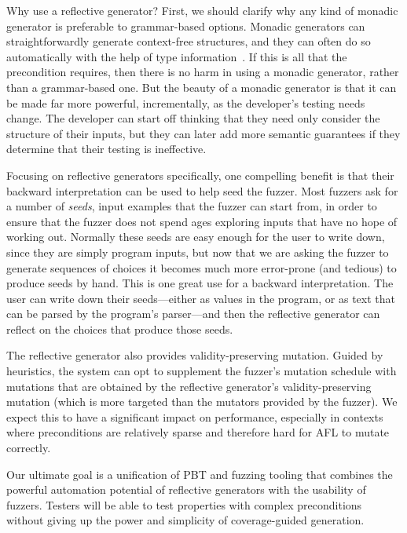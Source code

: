Why use a reflective generator? First, we should clarify why any kind of monadic
generator is preferable to grammar-based options. Monadic generators can
straightforwardly generate context-free structures, and they can often do so
automatically with the help of type information~\cite{mista2019deriving}. If
this is all that the precondition requires, then there is no harm in using a
monadic generator, rather than a grammar-based one. But the beauty of a monadic
generator is that it can be made far more powerful, incrementally, as the
developer's testing needs change. The developer can start off thinking that they
need only consider the structure of their inputs, but they can later add more
semantic guarantees if they determine that their testing is ineffective.

Focusing on reflective generators specifically, one compelling benefit is that
their backward interpretation can be used to help seed the fuzzer.  Most fuzzers
ask for a number of {\em seeds}, input examples that the fuzzer can start from,
in order to ensure that the fuzzer does not spend ages exploring
inputs that have no hope of working out. Normally these seeds are easy enough
for the user to write down, since they are simply program inputs, but now that
we are asking the fuzzer to generate sequences of choices it becomes much more
error-prone (and tedious) to produce seeds by hand.  This is one great use for a
backward interpretation. The user can write down their seeds---either as values
in the program, or as text that can be parsed by the program's parser---and then
the reflective generator can reflect on the choices that produce those seeds.

The reflective generator also provides validity-preserving mutation. Guided by
heuristics, the system can opt to supplement the fuzzer's mutation schedule with
mutations that are obtained by the reflective generator's validity-preserving
mutation (which is more targeted than the mutators provided by the fuzzer). We
expect this to have a significant impact on performance, especially in contexts
where preconditions are relatively sparse and therefore hard for AFL to mutate
correctly.

Our ultimate goal is a unification of PBT and fuzzing tooling that combines the
powerful automation potential of reflective generators with the usability of
fuzzers. Testers will be able to test properties with complex preconditions
without giving up the power and simplicity of coverage-guided generation.


